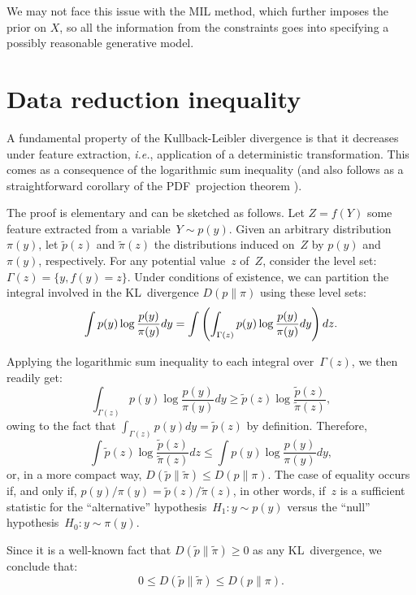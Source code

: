 \documentclass[english]{scrartcl}
\begin{document}
We may not face this issue with the MIL method, which further imposes
the prior on $X$, so all the information from the constraints goes
into specifying a possibly reasonable generative model.


\section{Data reduction inequality}
\label{sec:reduction_inequality}

A fundamental property of the Kullback-Leibler divergence is that it decreases under feature extraction, {\em i.e.}, application of a deterministic transformation. This comes as a consequence of the logarithmic sum inequality \cite{Cover-06} (and also follows as a straightforward corollary of the PDF~projection theorem \cite{Minka-04,Baggenstoss-15}). 

The proof is elementary and can be sketched as follows. Let $Z=f(Y)$ some feature extracted from a variable~$Y\sim p(y)$. Given an arbitrary distribution~$\pi(y)$, let  $\tilde{p}(z)$ and $\tilde{\pi}(z)$ the distributions induced on~$Z$ by $p(y)$ and $\pi(y)$, respectively. For any potential value~$z$ of~$Z$, consider the level set: $\Gamma(z)=\{y, f(y)=z\}$. Under conditions of existence, we can partition the integral involved in the KL~divergence $D(p\|\pi)$ using these level sets: 
$$
\int p(y) \log \frac{p(y)}{\pi(y)} dy
=
\int \left( \int_{\Gamma(z)} p(y) \log \frac{p(y)}{\pi(y)} dy \right) dz\\
.
$$

Applying the logarithmic sum inequality \cite{Cover-06} to each integral over~$\Gamma(z)$, we then readily get:
$$
\int_{\Gamma(z)} p(y) \log \frac{p(y)}{\pi(y)} dy
\geq 
\tilde{p}(z) \log \frac{\tilde{p}(z)}{\tilde{\pi}(z)}
,
$$
owing to the fact that $\displaystyle \int_{\Gamma(z)} p(y) dy = \tilde{p}(z)$ by definition. Therefore,
$$
\int \tilde{p}(z) \log \frac{\tilde{p}(z)}{\tilde{\pi}(z)} dz
\leq 
\int p(y) \log \frac{p(y)}{\pi(y)} dy
,
$$
or, in a more compact way, $D(\tilde{p}\|\tilde{\pi})\leq D(p\|\pi)$. The case of equality occurs if, and only if, $p(y)/\pi(y)=\tilde{p}(z)/\tilde{\pi}(z)$, in other words, if~$z$ is a sufficient statistic for the ``alternative'' hypothesis~$H_1:y\sim p(y)$ versus the ``null'' hypothesis~$H_0:y\sim\pi(y)$. 

Since it is a well-known fact that $D(\tilde{p}\|\tilde{\pi})\geq 0$ as any KL~divergence, we conclude that:
\begin{equation}
\label{eq:reduction_inequality}
0 
\leq D(\tilde{p}\|\tilde{\pi}) 
\leq D(p\|\pi)
.
\end{equation}
\end{document}
